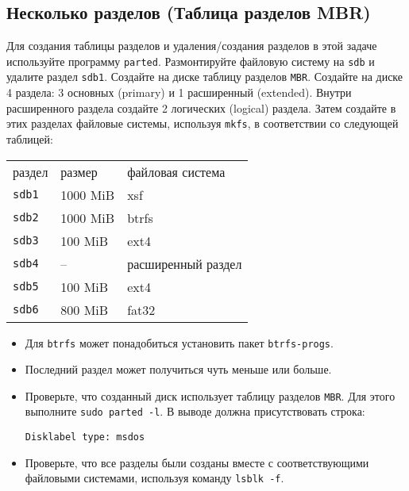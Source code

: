 \documentclass{article}
\begin{document}
\subsection{Несколько разделов (Таблица разделов MBR)}
Для создания таблицы разделов и удаления/создания разделов в этой задаче используйте программу \texttt{parted}. Размонтируйте файловую систему на \texttt{sdb} и удалите раздел \texttt{sdb1}. Создайте на диске таблицу разделов \texttt{MBR}. Создайте на диске 4 раздела: 3 основных (primary) и 1 расширенный (extended). Внутри расширенного раздела создайте 2 логических (logical) раздела. Затем создайте в этих разделах файловые системы, используя \texttt{mkfs}, в соответствии со следующей таблицей:
\begin{center}
\begin{tabular}{lll}
 раздел & размер  	& файловая система   \\
 \texttt{sdb1} 	& 1000 MiB 		& xsf   \\
 \texttt{sdb2} 	& 1000 MiB 		& btrfs \\
 \texttt{sdb3} 	& 100 MiB 	& ext4 \\
 \texttt{sdb4} 	& --	    & расширенный раздел \\
 \texttt{sdb5} 	& 100 MiB 	& ext4 \\
 \texttt{sdb6} 	& 800 MiB 	& fat32 \\
\end{tabular}
\end{center}

\begin{itemize}
\item Для \texttt{btrfs} может понадобиться установить пакет \texttt{btrfs-progs}.
\item Последний раздел может получиться чуть меньше или больше.
\item Проверьте, что созданный диск использует таблицу разделов \texttt{MBR}. Для этого выполните \texttt{sudo parted -l}. В выводе должна присутствовать строка:
\begin{lstlisting}
Disklabel type: msdos
\end{lstlisting}
\item Проверьте, что все разделы были созданы вместе с соответствующими файловыми системами, используя команду \texttt{lsblk -f}.
\end{itemize}
\end{document}
